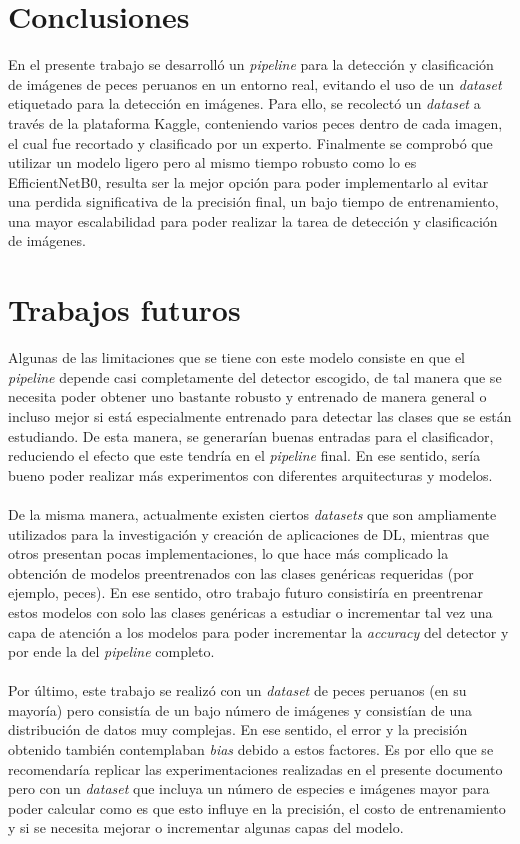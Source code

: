 \section{Conclusiones}
En el presente trabajo se desarrolló un \textit{pipeline} para la detección y clasificación de imágenes de peces peruanos en un entorno real, evitando el uso de un \textit{dataset} etiquetado para la detección en imágenes. Para ello, se recolectó un \textit{dataset} a través de la plataforma Kaggle, conteniendo varios peces dentro de cada imagen, el cual fue recortado y clasificado por un experto. Finalmente se comprobó que utilizar un modelo ligero pero al mismo tiempo robusto como lo es EfficientNetB0, resulta ser la mejor opción para poder implementarlo al evitar una perdida significativa de la precisión final, un bajo tiempo de entrenamiento, una mayor escalabilidad para poder realizar la tarea de detección y clasificación de imágenes. 

\section{Trabajos futuros}
Algunas de las limitaciones que se tiene con este modelo consiste en que el \textit{pipeline} depende casi completamente del detector escogido, de tal manera que se necesita poder obtener uno bastante robusto y entrenado de manera general o incluso mejor si está especialmente entrenado para detectar las clases que se están estudiando. De esta manera, se generarían buenas entradas para el clasificador, reduciendo el efecto que este tendría en el \textit{pipeline} final. En ese sentido, sería bueno poder realizar más experimentos con diferentes arquitecturas y modelos.
\\\\
De la misma manera, actualmente existen ciertos \textit{datasets} que son ampliamente utilizados para la investigación y creación de aplicaciones de DL, mientras que otros presentan pocas implementaciones, lo que hace más complicado la obtención de modelos preentrenados con las clases genéricas requeridas (por ejemplo, peces). En ese sentido, otro trabajo futuro consistiría en preentrenar estos modelos con solo las clases genéricas a estudiar o incrementar tal vez una capa de atención a los modelos para poder incrementar la \textit{accuracy} del detector y por ende la del \textit{pipeline} completo.   
\\\\
Por último, este trabajo se realizó con un \textit{dataset} de peces peruanos (en su mayoría) pero consistía de un bajo número de imágenes y consistían de una distribución de datos muy complejas. En ese sentido, el error y la precisión obtenido también contemplaban \textit{bias} debido a estos factores. Es por ello que se recomendaría replicar las experimentaciones realizadas en el presente documento pero con un \textit{dataset} que incluya un número de especies e imágenes mayor para poder calcular como es que esto influye en la precisión, el costo de entrenamiento y si se necesita mejorar o incrementar algunas capas del modelo.
